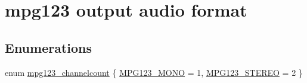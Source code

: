 \hypertarget{group__mpg123__output}{}\section{mpg123 output audio format}
\label{group__mpg123__output}
\subsection*{Enumerations}
\begin{DoxyCompactItemize}
\item 
enum \mbox{\hyperlink{group__mpg123__output_ga94df916cae2fc81b8a6df88c1728eb1c}{mpg123\+\_\+channelcount}} \{ \mbox{\hyperlink{group__mpg123__output_gga94df916cae2fc81b8a6df88c1728eb1ca5429c88158462f4290639ec505227c0c}{M\+P\+G123\+\_\+\+M\+O\+NO}} = 1, 
\mbox{\hyperlink{group__mpg123__output_gga94df916cae2fc81b8a6df88c1728eb1ca52d7aff6b35da496e7f430b37c0d4602}{M\+P\+G123\+\_\+\+S\+T\+E\+R\+EO}} = 2
 \}
\end{DoxyCompactItemize}
